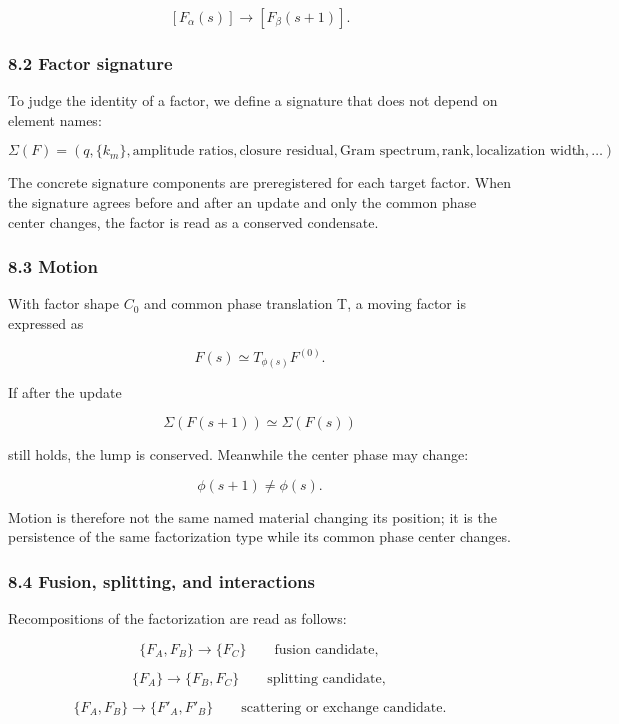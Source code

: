 \documentclass[
  a4paper,
]{article}
\begin{document}
\[
[F_\alpha(s)]
\longrightarrow
[F_\beta(s+1)].
\]

\subsubsection{8.2 Factor signature}\label{factor-signature}

To judge the identity of a factor, we define a signature that does not
depend on element names:

\[
\Sigma(F)
=
\left(
q,
\{k_m\},
\text{amplitude ratios},
\text{closure residual},
\text{Gram spectrum},
\text{rank},
\text{localization width},
\ldots
\right).
\]

The concrete signature components are preregistered for each target
factor. When the signature agrees before and after an update and only
the common phase center changes, the factor is read as a conserved
condensate.

\subsubsection{8.3 Motion}\label{motion}

With factor shape \(C_0\) and common phase translation T, a moving
factor is expressed as

\[
F(s)
\simeq
T_{\phi(s)}F^{(0)}.
\]

If after the update

\[
\Sigma(F(s+1))
\simeq
\Sigma(F(s))
\]

still holds, the lump is conserved. Meanwhile the center phase may
change:

\[
\phi(s+1)
\neq
\phi(s).
\]

Motion is therefore not the same named material changing its position;
it is the persistence of the same factorization type while its common
phase center changes.

\subsubsection{8.4 Fusion, splitting, and
interactions}\label{fusion-splitting-and-interactions}

Recompositions of the factorization are read as follows:

\[
\{F_A,F_B\}
\longrightarrow
\{F_C\}
\qquad
\text{fusion candidate},
\]

\[
\{F_A\}
\longrightarrow
\{F_B,F_C\}
\qquad
\text{splitting candidate},
\]

\[
\{F_A,F_B\}
\longrightarrow
\{F'_A,F'_B\}
\qquad
\text{scattering or exchange candidate}.
\]
\end{document}
